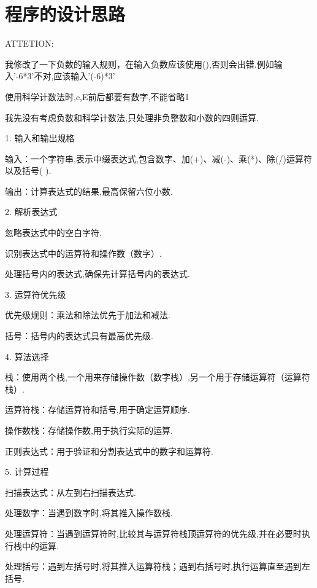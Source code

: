 \documentclass[UTF8]{ctexart}
\begin{document}
\pagestyle{fancy}
\fancyhead{}

\section{程序的设计思路}

ATTETION:

我修改了一下负数的输入规则，在输入负数应该使用(),否则会出错.例如输入'-6*3'不对,应该输入'(-6)*3'

使用科学计数法时,e,E前后都要有数字,不能省略1

我先没有考虑负数和科学计数法,只处理非负整数和小数的四则运算.

1. 输入和输出规格

输入：一个字符串,表示中缀表达式,包含数字、加(+)、减(-)、乘(*)、除(/)运算符以及括号( ).

输出：计算表达式的结果,最高保留六位小数.



2. 解析表达式

忽略表达式中的空白字符.

识别表达式中的运算符和操作数（数字）.

处理括号内的表达式,确保先计算括号内的表达式.



3. 运算符优先级

优先级规则：乘法和除法优先于加法和减法.

括号：括号内的表达式具有最高优先级.



4. 算法选择

栈：使用两个栈,一个用来存储操作数（数字栈）,另一个用于存储运算符（运算符栈）.

运算符栈：存储运算符和括号,用于确定运算顺序.

操作数栈：存储操作数,用于执行实际的运算.

正则表达式：用于验证和分割表达式中的数字和运算符.



5. 计算过程

扫描表达式：从左到右扫描表达式.

处理数字：当遇到数字时,将其推入操作数栈.

处理运算符：当遇到运算符时,比较其与运算符栈顶运算符的优先级,并在必要时执行栈中的运算.

处理括号：遇到左括号时,将其推入运算符栈；遇到右括号时,执行运算直至遇到左括号.
\end{document}
